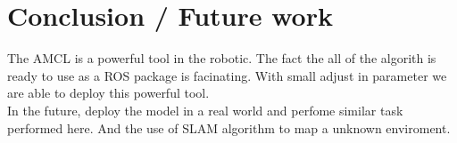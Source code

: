 \documentclass[10pt,journal,compsoc]{IEEEtran}
\begin{document}
\section{Conclusion / Future work}

The AMCL is a powerful tool in the robotic. The fact the all of the algorith is ready to use as a ROS package is
    facinating. With small adjust in parameter we are able to deploy this powerful tool.\\
    In the future, deploy the model in a real world and perfome similar task performed here. And the use of SLAM
    algorithm to map a unknown enviroment. 


\nocite{*}


\end{document}
